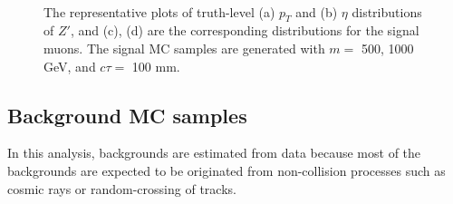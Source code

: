 \begin{figure}[!htb]
    \centering
     \\
    \caption{The representative plots of truth-level (a) $p_{T}$ and (b) $\eta$ distributions of $Z'$, and (c), (d) are the corresponding distributions for the signal muons. The signal MC samples are generated with $m=$ 500, 1000 GeV, and $c\tau=$ 100 mm.}
    \label{fig:truth_zp_muon}
\end{figure}


\subsection{Background MC samples}
\label{sec:background_mc_sample}
In this analysis, backgrounds are estimated from data because most of the backgrounds are expected to be originated from non-collision processes such as cosmic rays or random-crossing of tracks. %

